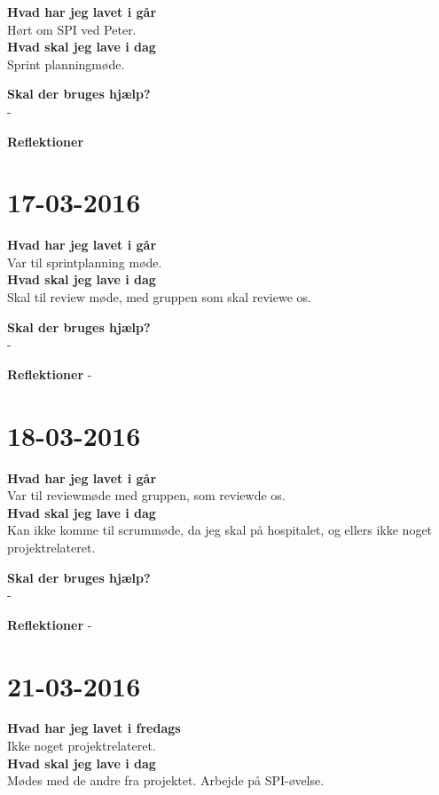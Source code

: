 \documentclass{article}
\begin{document}
	\textbf{Hvad har jeg lavet i går}\\
	Hørt om SPI ved Peter.\\
	
	\textbf{Hvad skal jeg lave i dag}\\
	Sprint planningmøde.    
	
	\textbf{Skal der bruges hjælp?}\\
	-
	
	\textbf{Reflektioner}
	
	
	\section{17-03-2016}
	
	\textbf{Hvad har jeg lavet i går}\\
	Var til sprintplanning møde.\\
	
	\textbf{Hvad skal jeg lave i dag}\\
	Skal til review møde, med gruppen som skal reviewe os.    
	
	\textbf{Skal der bruges hjælp?}\\
	-
	
	\textbf{Reflektioner}
	-
	
	\section{18-03-2016}
	
	\textbf{Hvad har jeg lavet i går}\\
	Var til reviewmøde med gruppen, som reviewde os.\\
	
	\textbf{Hvad skal jeg lave i dag}\\
	Kan ikke komme til scrummøde, da jeg skal på hospitalet, og ellers ikke noget projektrelateret.    
	
	\textbf{Skal der bruges hjælp?}\\
	-
	
	\textbf{Reflektioner}
	-
	
	\section{21-03-2016}
	
	\textbf{Hvad har jeg lavet i fredags}\\
	Ikke noget projektrelateret.\\
	
	\textbf{Hvad skal jeg lave i dag}\\
	Mødes med de andre fra projektet. Arbejde på SPI-øvelse.\\    
	
\end{document}
